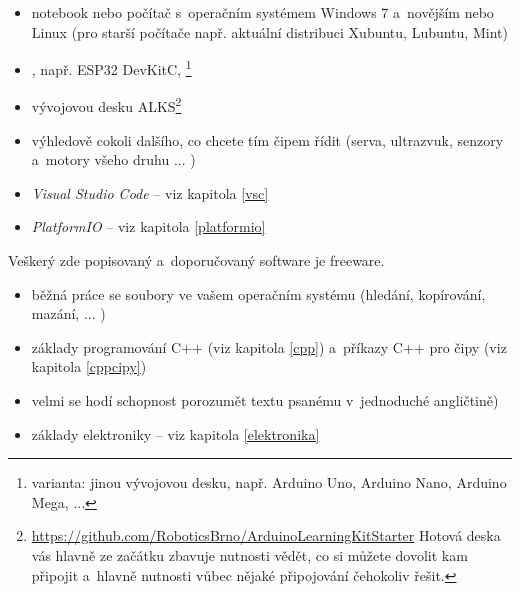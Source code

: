 \begin{itemize} 
\item  notebook nebo počítač s~operačním systémem Windows 7 a~novějším nebo Linux (pro starší počítače např. aktuální distribuci Xubuntu, Lubuntu, Mint)
\item  {}, např. ESP32 DevKitC, \footnote{varianta: jinou vývojovou desku, např. Arduino Uno, Arduino Nano, Arduino Mega, ...}
\item  vývojovou desku ALKS\footnote{\url{https://github.com/RoboticsBrno/ArduinoLearningKitStarter}  %
Hotová deska vás hlavně ze začátku zbavuje nutnosti vědět, co si můžete dovolit kam připojit a~hlavně nutnosti vůbec nějaké připojování čehokoliv řešit. }
\item výhledově cokoli dalšího, co chcete tím čipem řídit (serva, ultrazvuk, senzory a~motory všeho druhu ... )
\end{itemize}

\begin{itemize} 
\item  {\it Visual Studio Code} -- viz kapitola \ref{vsc}
\item  {\it PlatformIO }-- viz kapitola \ref{platformio}
\end{itemize}
Veškerý zde popisovaný a~doporučovaný software je freeware.

\vspace*{1ex}

\begin{itemize} 
\item  běžná práce se soubory ve vašem operačním systému (hledání, kopírování, mazání, ... )
\item  základy programování C++ (viz kapitola \ref{cpp}) a~příkazy C++ pro čipy (viz kapitola \ref{cppcipy})
\item  velmi se hodí schopnost porozumět textu psanému v~jednoduché angličtině)
\item  základy elektroniky -- viz kapitola \ref{elektronika}
\end{itemize}

\vspace*{1ex}

